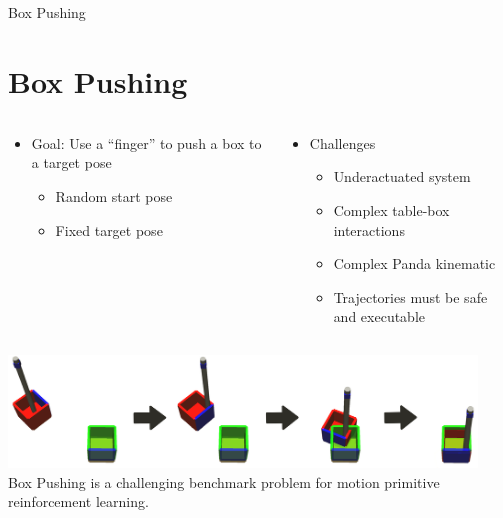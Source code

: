 \documentclass[16:9,en,navbarinfooter]{sdqbeamer}
\begin{document}
\begin{frame}{Box Pushing}
	\section{Box Pushing}

	\begin{columns}[t]
		\begin{column}{0.5\textwidth}
			\begin{itemize}
				\item Goal: Use a ``finger'' to push a box to a target pose
				      \begin{itemize}
					      \item Random start pose
					      \item Fixed target pose
				      \end{itemize}
			\end{itemize}
		\end{column}
		\begin{column}{0.5\textwidth}
			\begin{itemize}
				\item Challenges
				      \begin{itemize}
					      \item Underactuated system
					      \item Complex table-box interactions
					      \item Complex Panda kinematic
					      \item Trajectories must be safe and executable
				      \end{itemize}
			\end{itemize}
		\end{column}


	\end{columns}
	\center
	\includegraphics[height=3cm]{media/2dboxpushing.png}
	\vspace{.1cm}\\
	Box Pushing is a challenging benchmark problem for motion primitive reinforcement learning.
\end{frame}
\end{document}

